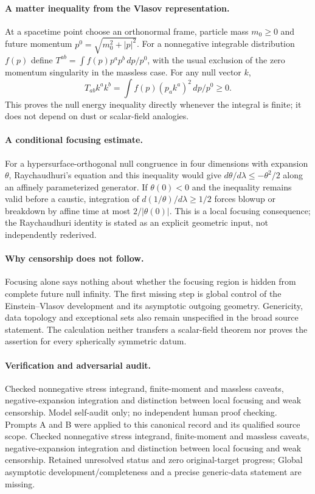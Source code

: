 \documentclass[11pt]{article}
\begin{document}
\paragraph{A matter inequality from the Vlasov representation.} At a spacetime point choose an orthonormal frame, particle mass $m_0\geq0$ and future momentum $p^0=\sqrt{m_0^2+|p|^2}$. For a nonnegative integrable distribution $f(p)$ define $T^{ab}=\int f(p)p^ap^b\,dp/p^0$, with the usual exclusion of the zero momentum singularity in the massless case. For any null vector $k$,
\[
 T_{ab}k^ak^b=\int f(p)(p_ak^a)^2\,dp/p^0\geq0.
\]
This proves the null energy inequality directly whenever the integral is finite; it does not depend on dust or scalar-field analogies.

\paragraph{A conditional focusing estimate.} For a hypersurface-orthogonal null congruence in four dimensions with expansion $\theta$, Raychaudhuri's equation and this inequality would give $d\theta/d\lambda\leq-\theta^2/2$ along an affinely parameterized generator. If $\theta(0)<0$ and the inequality remains valid before a caustic, integration of $d(1/\theta)/d\lambda\geq1/2$ forces blowup or breakdown by affine time at most $2/|\theta(0)|$. This is a local focusing consequence; the Raychaudhuri identity is stated as an explicit geometric input, not independently rederived.

\paragraph{Why censorship does not follow.} Focusing alone says nothing about whether the focusing region is hidden from complete future null infinity. The first missing step is global control of the Einstein--Vlasov development and its asymptotic outgoing geometry. Genericity, data topology and exceptional sets also remain unspecified in the broad source statement. The calculation neither transfers a scalar-field theorem nor proves the assertion for every spherically symmetric datum.

\paragraph{Verification and adversarial audit.}
Checked nonnegative stress integrand, finite-moment and massless caveats, negative-expansion integration and distinction between local focusing and weak censorship. Model self-audit only; no independent human proof checking. Prompts A and B were applied to this canonical record and its qualified source scope. Checked nonnegative stress integrand, finite-moment and massless caveats, negative-expansion integration and distinction between local focusing and weak censorship. Retained unresolved status and zero original-target progress; Global asymptotic development/completeness and a precise generic-data statement are missing.
\end{document}
